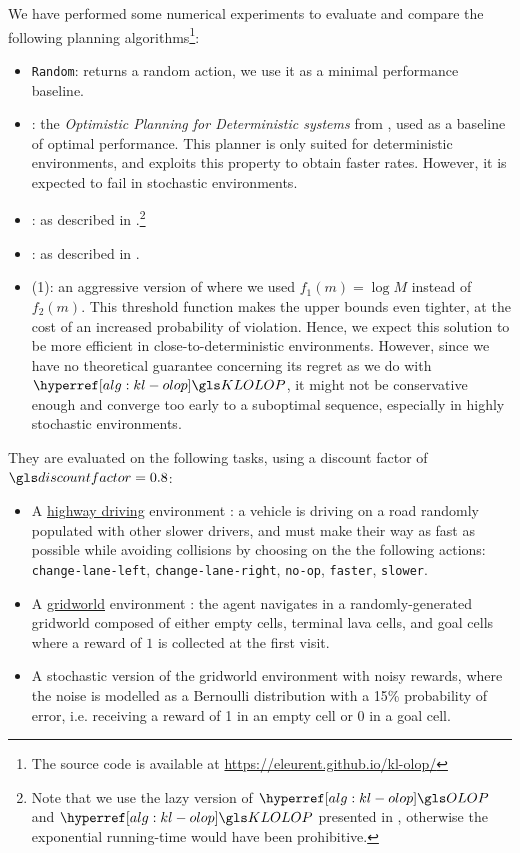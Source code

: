 We have performed some numerical experiments to evaluate and compare the following planning algorithms\footnote[1]{The source code is available at \url{https://eleurent.github.io/kl-olop/}}:
\begin{itemize}
	\item \texttt{Random}: returns a random action, we use it as a minimal performance baseline.
	\item \OPD: the \emph{Optimistic Planning for Deterministic systems} from \citep{Hren2008}, used as a baseline of optimal performance. This planner is only suited for deterministic environments, and exploits this property to obtain faster rates. However, it is expected to fail in stochastic environments.
	\item \OLOP: as described in .\footnote[2]{Note that we use the lazy version of $\OLOP$ and $\KLOLOP$ presented in , otherwise the exponential running-time would have been prohibitive.}
	\item \KLOLOP: as described in .\footnotemark[2]
	\item \KLOLOP(1): an aggressive version of \KLOLOP where we used $f_1(m) = \log M$ instead of $f_2(m)$. This threshold function makes the upper bounds even tighter, at the cost of an increased probability of violation. Hence, we expect this solution to be more efficient in close-to-deterministic environments. However, since we have no theoretical guarantee concerning its regret as we do with $\KLOLOP$, it might not be conservative enough and converge too early to a suboptimal sequence, especially in highly stochastic environments.
\end{itemize}

They are evaluated on the following tasks, using a discount factor of $\discount=0.8$:
\begin{itemize}
	\item A \href{https://github.com/eleurent/highway-env/}{highway driving} environment \citep{highway-env}: a vehicle is driving on a road randomly populated with other slower drivers, and must make their way as fast as possible while avoiding collisions by choosing on the the following actions: \texttt{change-lane-left}, \texttt{change-lane-right}, \texttt{no-op}, \texttt{faster}, \texttt{slower}.
	\item A \href{https://github.com/maximecb/gym-minigrid}{gridworld} environment \citep{gym_minigrid}: the agent navigates in a randomly-generated gridworld composed of either empty cells, terminal lava cells, and goal cells where a reward of $1$ is collected at the first visit.
	\item A stochastic version of the gridworld environment with noisy rewards, where the noise is modelled as a Bernoulli distribution with a 15\% probability of error, i.e. receiving a reward of 1 in an empty cell or 0 in a goal cell.
\end{itemize}

